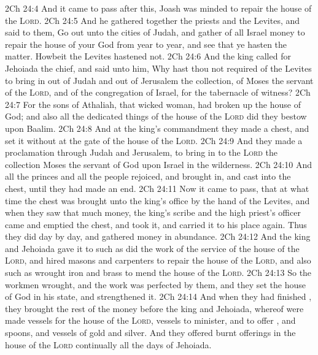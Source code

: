 \vs 2Ch 24:4 And it came to pass after this,  Joash was minded to repair the house of the \textsc{Lord}.
\vs 2Ch 24:5 And he gathered together the priests and the Levites, and said to them, Go out unto the cities of Judah, and gather of all Israel money to repair the house of your God from year to year, and see that ye hasten the matter. Howbeit the Levites hastened  not.
\vs 2Ch 24:6 And the king called for Jehoiada the chief, and said unto him, Why hast thou not required of the Levites to bring in out of Judah and out of Jerusalem the collection,  of Moses the servant of the \textsc{Lord}, and of the congregation of Israel, for the tabernacle of witness?
\vs 2Ch 24:7 For the sons of Athaliah, that wicked woman, had broken up the house of God; and also all the dedicated things of the house of the \textsc{Lord} did they bestow upon Baalim.
\vs 2Ch 24:8 And at the king's commandment they made a chest, and set it without at the gate of the house of the \textsc{Lord}.
\vs 2Ch 24:9 And they made a proclamation through Judah and Jerusalem, to bring in to the \textsc{Lord} the collection  Moses the servant of God  upon Israel in the wilderness.
\vs 2Ch 24:10 And all the princes and all the people rejoiced, and brought in, and cast into the chest, until they had made an end.
\vs 2Ch 24:11 Now it came to pass, that at what time the chest was brought unto the king's office by the hand of the Levites, and when they saw that  much money, the king's scribe and the high priest's officer came and emptied the chest, and took it, and carried it to his place again. Thus they did day by day, and gathered money in abundance.
\vs 2Ch 24:12 And the king and Jehoiada gave it to such as did the work of the service of the house of the \textsc{Lord}, and hired masons and carpenters to repair the house of the \textsc{Lord}, and also such as wrought iron and brass to mend the house of the \textsc{Lord}.
\vs 2Ch 24:13 So the workmen wrought, and the work was perfected by them, and they set the house of God in his state, and strengthened it.
\vs 2Ch 24:14 And when they had finished , they brought the rest of the money before the king and Jehoiada, whereof were made vessels for the house of the \textsc{Lord},  vessels to minister, and to offer , and spoons, and vessels of gold and silver. And they offered burnt offerings in the house of the \textsc{Lord} continually all the days of Jehoiada.
